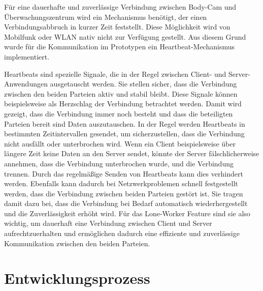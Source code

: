 \documentclass[thesis.tex]{subfiles}
\begin{document}
Für eine dauerhafte und zuverlässige Verbindung zwischen Body-Cam und Überwachungszentrum wird ein Mechanismus benötigt, der einen Verbindungsabbruch in kurzer Zeit feststellt.
Diese Möglichkeit wird von Mobilfunk oder WLAN nativ nicht zur Verfügung gestellt.
Aus diesem Grund wurde für die Kommunikation im Prototypen ein Heartbeat-Mechanismus implementiert.

Heartbeats sind spezielle Signale, die in der Regel zwischen Client- und Server-Anwendungen ausgetauscht werden.
Sie stellen sicher, dass die Verbindung zwischen den beiden Parteien aktiv und stabil bleibt.
Diese Signale können beispielsweise als \glqq Herzschlag\grqq{} der Verbindung betrachtet werden.
Damit wird gezeigt, dass die Verbindung immer noch besteht und dass die beteiligten Parteien bereit sind Daten auszutauschen.
In der Regel werden Heartbeats in bestimmten Zeitintervallen gesendet, um sicherzustellen, dass die Verbindung nicht ausfällt oder unterbrochen wird.
Wenn ein Client beispielsweise über längere Zeit keine Daten an den Server sendet, könnte der Server fälschlicherweise annehmen, dass die Verbindung unterbrochen wurde, und die Verbindung trennen.
Durch das regelmäßige Senden von Heartbeats kann dies verhindert werden.
Ebenfalls kann dadurch bei Netzwerkproblemen schnell festgestellt werden, dass die Verbindung zwischen beiden Parteien gestört ist.
Sie tragen damit dazu bei, dass die Verbindung bei Bedarf automatisch wiederhergestellt und die Zuverlässigkeit erhöht wird.
Für das Lone-Worker Feature sind sie also wichtig, um dauerhaft eine Verbindung zwischen Client und Server aufrechtzuerhalten und ermöglichen dadurch eine effiziente und zuverlässige Kommunikation zwischen den beiden Parteien.

\section{Entwicklungsprozess}
\end{document}
